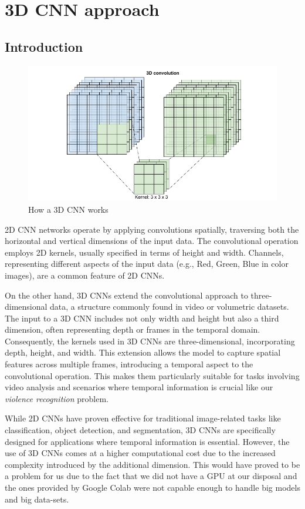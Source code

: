 \chapter{3D CNN approach}
\label{chapter:3D}
\section{Introduction}
\begin{figure}[h]
    \centering
    \includegraphics[width=\textwidth]{./images/3DCNN.png}
    \caption{How a 3D CNN works}
    \label{fig:How3DCNNWorks}
\end{figure}

2D CNN networks operate by applying convolutions spatially, traversing both the horizontal and vertical dimensions of the input data. The convolutional operation employs 2D kernels, usually specified in terms of height and width. Channels, representing different aspects of the input data (e.g., Red, Green, Blue in color images), are a common feature of 2D CNNs.

On the other hand, 3D CNNs extend the convolutional approach to three-dimensional data, a structure commonly found in video or volumetric datasets. The input to a 3D CNN includes not only width and height but also a third dimension, often representing depth or frames in the temporal domain. Consequently, the kernels used in 3D CNNs are three-dimensional, incorporating depth, height, and width. This extension allows the model to capture spatial features across multiple frames, introducing a temporal aspect to the convolutional operation. This makes them particularly suitable for tasks involving video analysis and scenarios where temporal information is crucial like our \textit{violence recognition} problem.

While 2D CNNs have proven effective for traditional image-related tasks like classification, object detection, and segmentation, 3D CNNs are specifically designed for applications where temporal information is essential. However, the use of 3D CNNs comes at a higher computational cost due to the increased complexity introduced by the additional dimension. This would have proved to be a problem for us due to the fact that we did not have a GPU at our disposal and the ones provided by Google Colab were not capable enough to handle big models and big data-sets.

